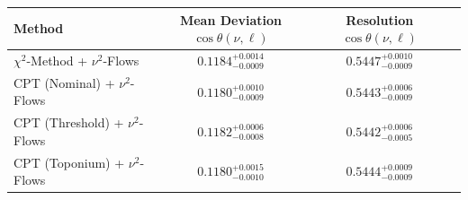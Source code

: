     \begin{tabular}{lccc}
        \toprule
        Method & Mean Deviation $\cos\theta(\nu, \ell)$ & Resolution $\cos\theta(\nu, \ell)$ \\
        \midrule
        $\chi^2$-Method + $\nu^2$-Flows & $0.1184^{+0.0014}_{-0.0009}$ & $0.5447^{+0.0010}_{-0.0009}$ \\
        CPT (Nominal) + $\nu^2$-Flows & $0.1180^{+0.0010}_{-0.0009}$ & $0.5443^{+0.0006}_{-0.0009}$ \\
        CPT (Threshold) + $\nu^2$-Flows & $0.1182^{+0.0006}_{-0.0008}$ & $0.5442^{+0.0006}_{-0.0005}$ \\
        CPT (Toponium) + $\nu^2$-Flows & $0.1180^{+0.0015}_{-0.0010}$ & $0.5444^{+0.0009}_{-0.0009}$ \\
        \bottomrule
    \end{tabular}